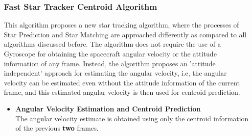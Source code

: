 \documentclass[../../main.tex]{subfiles}
\begin{document}
\subsubsection{Fast Star Tracker Centroid Algorithm}
This algorithm proposes a new star tracking algorithm, where the processes of Star Prediction and Star Matching are approached differently as compared to all algorithms discussed before. The algorithm does not require the use of a Gyroscope for obtaining the spacecraft angular velocity or the attitude information of any frame. Instead, the algorithm proposes an 'attitude independent' approach for estimating the angular velocity, i.e, the angular velocity can be estimated even without the attitude information of the current frame, and this estimated angular velocity is then used for centroid prediction. 
\begin{itemize}
    \item \textbf{Angular Velocity Estimation and Centroid Prediction}\\
    The angular velocity estimate is obtained using only the centroid information of the previous \textbf{two} frames. 

\end{itemize}
\end{document}
